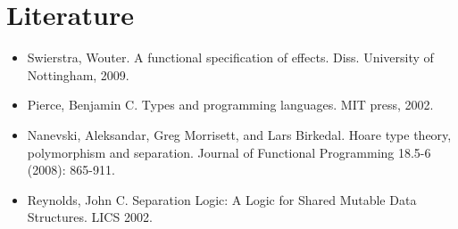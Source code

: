 \documentclass{article}
\begin{document}
\section{Literature}

\begin{itemize}
\item[] Swierstra, Wouter. A functional specification of effects. Diss. University of Nottingham, 2009.

\item[] Pierce, Benjamin C. Types and programming languages. MIT press, 2002.

\item[] Nanevski, Aleksandar, Greg Morrisett, and Lars Birkedal. Hoare type theory, polymorphism and separation. Journal of Functional Programming 18.5-6 (2008): 865-911.

\item[] Reynolds, John C. Separation Logic: A Logic for Shared Mutable Data Structures. LICS 2002.
\end{itemize}
\end{document}
